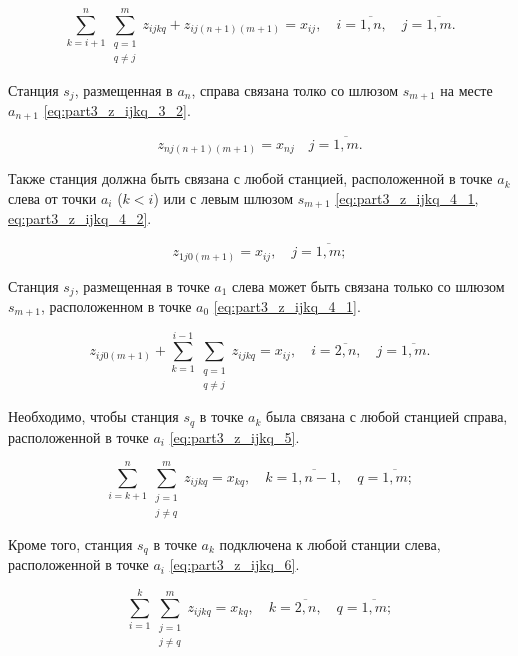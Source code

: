 \begin{equation}
  \label{eq:part3_z_ijkq_3_1}
  \sum\limits_{k=i+1}^{n} \sum\limits_{\substack{q = 1\\ q \neq j}}^m z_{ijkq} + z_{ij(n+1)(m+1)} = x_{ij} ,  \quad i = \overline{1, n}, \quad j = \overline{1, m}.
\end{equation}


Станция $ s_j $, размещенная в $ a_{n} $, справа связана толко со шлюзом $ s_{m + 1} $ на месте $ a_ {n+1}$ \cref{eq:part3_z_ijkq_3_2}. 

\begin{equation}
  \label{eq:part3_z_ijkq_3_2}
  z_{nj(n+1)(m+1)} = x_{nj} \quad j = \overline{1, m}.
\end{equation}

Также станция должна быть связана с любой станцией, расположенной в точке $ a_k $ слева от точки $ a_i $ ($ k <i $) или с левым шлюзом $ s_{m + 1} $ \cref{eq:part3_z_ijkq_4_1, eq:part3_z_ijkq_4_2}.

\begin{equation}
  \label{eq:part3_z_ijkq_4_1}
  z_{1j0(m+1)}= x_{ij}, \quad j = \overline{1, m};
\end{equation}

Станция $s_j$, размещенная в точке $a_{1}$ слева может быть связана только со шлюзом $s_{m+1}$, расположенном в точке $a_0$ \cref{eq:part3_z_ijkq_4_1}.

\begin{equation}
  \label{eq:part3_z_ijkq_4_2}
  z_{ij0(m+1)} + \sum\limits_{k=1}^{i-1} \sum\limits_{\substack{q = 1\\ q \neq j}} z_{ijkq}= x_{ij}, \quad i = \overline{2, n}, \quad j = \overline{1, m}.
\end{equation}

Необходимо, чтобы станция $ s_q $ в точке $ a_k $ была связана с любой станцией справа, расположенной в точке $ a_i $ \cref{eq:part3_z_ijkq_5}.

\begin{equation}
  \label{eq:part3_z_ijkq_5}
  \sum\limits_{i=k+1}^{n} \sum\limits_{\substack{j=1 \\ j \neq q}}^m z_{ijkq} = x_{kq} , \quad k = \overline{1, n-1}, \quad q = \overline{1, m};
\end{equation}

Кроме того, станция $ s_q $ в точке $ a_k $ подключена к любой станции слева, расположенной в точке $ a_i $ \cref{eq:part3_z_ijkq_6}. 

\begin{equation}
  \label{eq:part3_z_ijkq_6}
  \sum\limits_{i=1}^{k} \sum\limits_{\substack{j=1 \\ j \neq q}}^m z_{ijkq} = x_{kq} , \quad k = \overline{2, n}, \quad q = \overline{1, m};
\end{equation}

